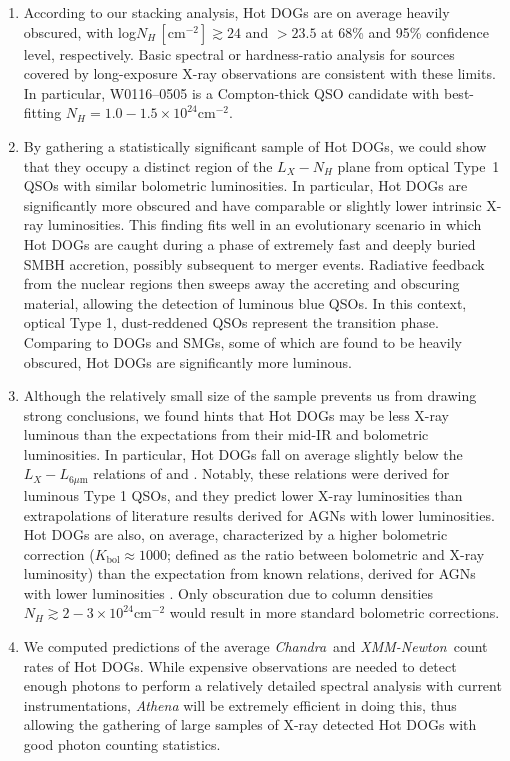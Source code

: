 \documentclass[useAMS,usenatbib]{mnras}
\newcommand*{\xmm}{\textit{\mbox{XMM-Newton}}}
\newcommand*{\chandra}{\textit{Chandra}}
\newcommand*{\nhunits}{\mathrm{cm^{-2}}}
\begin{document}
\begin{enumerate}
\item According to our stacking analysis, Hot DOGs are on average heavily obscured, with \mbox{log$N_H\,\mathrm{[\nhunits]}\gtrsim24$} and $>23.5$ at 68\% and 95\% confidence level, respectively. Basic spectral  or hardness-ratio analysis for sources covered by long-exposure X-ray observations are consistent with these limits. In particular, W0116--0505 is a Compton-thick QSO candidate with best-fitting $N_H=1.0-1.5\times10^{24}\nhunits$.

\item By gathering a statistically significant sample of Hot DOGs, we could show that they occupy a distinct region of the $L_X-N_H$ plane from optical Type~1 QSOs with similar bolometric luminosities. In particular, Hot DOGs are significantly more obscured and have comparable or slightly lower intrinsic X-ray luminosities. 
This finding fits well in an evolutionary scenario in which Hot DOGs are caught during a phase of extremely fast and deeply buried SMBH accretion, possibly subsequent to merger events. Radiative feedback from the nuclear regions then sweeps away the accreting and obscuring material, allowing the detection of luminous blue QSOs. In this context, optical Type 1, dust-reddened QSOs represent the transition phase. Comparing to DOGs and SMGs, some of which are found to be heavily obscured, Hot DOGs are significantly more luminous.

\item Although the relatively small size of the sample prevents us from drawing strong conclusions, we found hints that Hot DOGs may be less X-ray luminous than the expectations from their mid-IR and bolometric luminosities. In particular, Hot DOGs fall on average slightly below the $L_X-L_{6\mu\mathrm{m}}$ relations of \cite{Stern15} and \cite{Chen17}. Notably, these relations were derived for luminous Type 1 QSOs, and they predict lower X-ray luminosities than extrapolations of literature results derived for AGNs with lower luminosities.
Hot DOGs are also, on average, characterized by a higher bolometric correction ($K_{\mathrm{bol}}\approx1000$; defined as the ratio between bolometric and X-ray luminosity) than the expectation from known relations, derived for AGNs with lower luminosities \citep[e.g.,][]{Lusso12}. Only obscuration due to column densities $N_H\gtrsim2-3\times10^{24}\nhunits$ would result in more standard bolometric corrections.

\item We computed predictions of the average \chandra\, and \xmm\, count rates of Hot DOGs. While expensive observations are needed to detect enough photons to perform a relatively detailed spectral analysis with current instrumentations, \textit{Athena} will be extremely efficient in doing this, thus allowing the gathering of large samples of X-ray detected Hot DOGs with good photon counting statistics. 

\end{enumerate}
\end{document}
